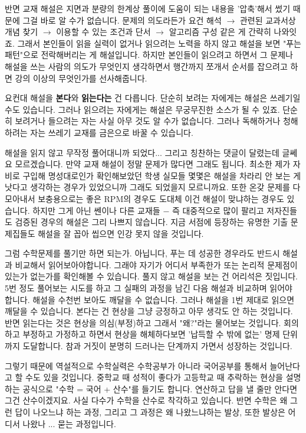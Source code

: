 반면 교재 해설은 지면과 분량의 한계상 풀이에 도움이 되는 내용을 '압축'해서 썼기 때문에 그걸 바로 알 수가 없습니다.
문제의 의도라든가 요건 해석 $\rightarrow$ 관련된 교과서상 개념 찾기 $\rightarrow$ 이용할 수 있는 조건과 단서 $\rightarrow$ 알고리즘 구성 같은 게 간략히 나와잇죠.
그래서 본인들이 읽을 실력이 없거나 읽으려는 노력을 하지 않고 해설을 보면 "푸는 패턴"으로 전락해버리는 게 해설입니다.
하지만 본인들이 읽으려고 하면서 그 문제나 해설을 쓰는 사람의 의도가 무엇인지 생각하면서 행간까지 쪼개서 순서를 잡으려고 하면
강의 이상의 무엇인가를 선사해줍니다.
\vspace{5mm}

요컨대 해설을 \textbf{본다}와 \textbf{읽는다는} 건 다릅니다.
단순히 보려는 자에게는 해설은 쓰레기일 수도 있습니다.
그러나 읽으려는 자에게는 해설은 무궁무진한 소스가 될 수 있죠.
단순히 보려거나 들으려는 자는 사실 아무 것도 알 수가 없습니다.
그러나 독해하거나 청해하려는 자는 쓰레기 교재를 금은으로 바꿀 수 있습니다.
\vspace{5mm}

해설을 읽지 않고 무작정 풀어대니까 되었다... 그리고 칭찬하는 댓글이 달렸는데 글쎄요 모르겠습니다.
만약 교재 해설이 정말 문제가 많다면 그래도 됩니다. 최소한 제가 자비로 구입해 명성대로인가 확인해보았던 학생 실모들 몇몇은
해설을 차라리 안 보는 게 낫다고 생각하는 경우가 있었으니까 그래도 되었을지 모르니까요.
또한 온갖 문제를 다 모아내서 보충용으로는 좋은 RPM의 경우도 도대체 이건 해설이 맞냐하는 경우도 있습니다.
하지만 그게 아닌 쎈이나 다른 교재들 $-$ 즉 대중적으로 많이 팔리고 저자진들도 검증된 경우의 해설은 그리 나쁘지 않습니다.
지금 서점에 등장하는 유명한 기출 문제집들도 해설을 잘 꼽아 씹으면 인강 못지 않을 것입니다.
\vspace{5mm}

그럼 수학문제를 풀기만 하면 되는가. 아닙니다, 푸는 데 성공한 경우라도 반드시 해설과 비교해서 읽어보아야합니다.
그래야 자기가 어디서 부족한가 또는 논리적 문제점이 있는가 없는가를 확인해볼 수 있습니다.
풀지 않고 해설을 보는 건 어리석은 짓입니다.
5번 정도 풀어보는 시도를 하고 그 실패의 과정을 남긴 다음 해설과 비교하며 읽어야 합니다.
해설을 수천번 보아도 깨달을 수 없습니다. 그러나 해설을 1번 제대로 읽으면 깨달을 수 있습니다.
본다는 건 현상을 그냥 긍정하고 아무 생각도 안 하는 것입니다.
반면 읽는다는 것은 현상을 의심(부정)하고 그래서 "왜?"라는 물어보는 것입니다.
회의하고 부정하고 가정하고 하면서 현상을 해체하다보면 '납득할 수 밖에 없는' 명제 단위까지 도달합니다.
참과 거짓이 분명히 드러나는 단계까지 가면서 성장하는 것입니다.
\vspace{5mm}

그렇기 때문에 역설적으로 수학실력은 수학공부가 아니라 국어공부를 통해서 늘어난다고 할 수도 있을 것입니다.
중학교 때 성적이 좋다가 고등학교 때 추락하는 현상을 설명하는 공식으로 "수학 = 국어 + 산수"를 들기도 합니다.
연산하고 답을 낼 줄만 안다면 그건 산수이겠지요. 사실 다수가 수학을 산수로 착각하고 있습니다.
반면 수학은 왜 그런 답이 나오느냐 하는 과정, 그리고 그 과정은 왜 나왔느냐하는 발상, 또한 발상은 어디서 나왔나 ... 묻는 과정입니다.
\vspace{5mm}


